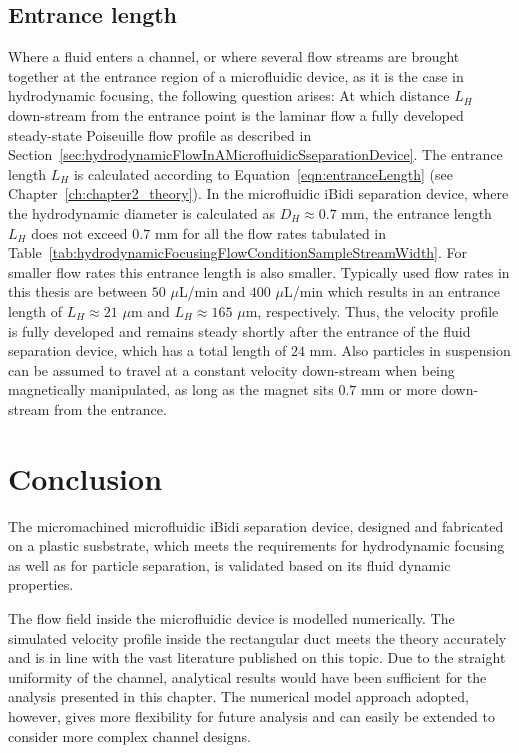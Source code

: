 \subsection{Entrance length}\label{subsec:entranceLength}
Where a fluid enters a channel, or where several flow streams are brought together at the entrance region of a microfluidic device, as it is the case in hydrodynamic focusing, the following question arises: At which distance $L_{H}$ down-stream from the entrance point is the laminar flow a fully developed steady-state Poiseuille flow profile as described in Section~\ref{sec:hydrodynamicFlowInAMicrofluidicSseparationDevice}. The entrance length $L_{H}$ is calculated according to Equation~\ref{eqn:entranceLength} (see Chapter~\ref{ch:chapter2_theory}). In the microfluidic iBidi separation device, where the hydrodynamic diameter is calculated as $D_{H} \approx 0.7$ mm, the entrance length $L_{H}$ does not exceed $0.7$ mm for all the flow rates tabulated in Table~\ref{tab:hydrodynamicFocusingFlowConditionSampleStreamWidth}. For smaller flow rates this entrance length is also smaller. Typically used flow rates in this thesis are between $50$ $\mu$L/min and $400$ $\mu$L/min which results in an entrance length of $L_{H} \approx 21$ $\mu$m and $L_{H} \approx 165$ $\mu$m, respectively. Thus, the velocity profile is fully developed and remains steady shortly after the entrance of the fluid separation device, which has a total length of $24$ mm. Also particles in suspension can be assumed to travel at a constant velocity down-stream when being magnetically manipulated, as long as the magnet sits $0.7$ mm or more down-stream from the entrance. 

\section{Conclusion}\label{sec:conclusionChapter5Fluiddynamics}
The micromachined microfluidic iBidi separation device, designed and fabricated on a plastic susbstrate, which meets the requirements for hydrodynamic focusing as well as for particle separation, is validated based on its fluid dynamic properties.

The flow field inside the microfluidic device is modelled numerically. The simulated velocity profile inside the rectangular duct meets the theory accurately and is in line with the vast literature published on this topic. Due to the straight uniformity of the channel, analytical results would have been sufficient for the analysis presented in this chapter. The numerical model approach adopted, however, gives more flexibility for future analysis and can easily be extended to consider more complex channel designs.

